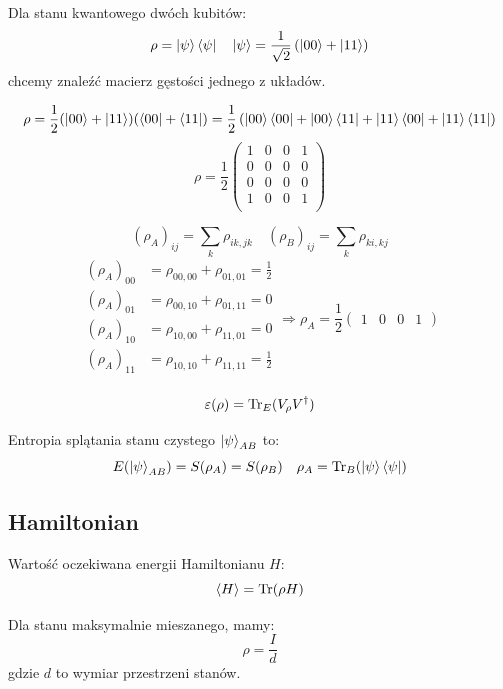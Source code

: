\documentclass{../notatki}
\begin{document}
\begin{examplebox}
  Dla stanu kwantowego dwóch kubitów:
  $$
  \rho = \ket{\psi} \bra{\psi} \quad \ket{\psi} = \frac{1}{\sqrt{2}}
  \left(\ket{00} + \ket{11}\right)
  $$
  chcemy znaleźć macierz gęstości jednego z układów.

  $$
  \rho = \frac{1}{2} (\ket{00} + \ket{11})(\bra{00} + \bra{11}) = \frac{1}{2}
  \left(\ket{00} \bra{00} + \ket{00} \bra{11} + \ket{11} \bra{00} +
  \ket{11} \bra{11}\right)
  $$
  $$
  \rho = \frac{1}{2}
  \begin{pmatrix}
    1 & 0 & 0 & 1 \\
    0 & 0 & 0 & 0 \\
    0 & 0 & 0 & 0 \\
    1 & 0 & 0 & 1 \\
  \end{pmatrix}
  $$

  $$
  (\rho_A)_{ij} = \sum_k \rho_{ik,jk} \quad (\rho_B)_{ij} = \sum_k \rho_{ki, kj}
  $$
  $$
  \begin{aligned}
    (\rho_A)_{00} &= \rho_{00, 00} + \rho_{01,01} = \frac{1}{2} \\
    (\rho_A)_{01} &= \rho_{00, 10} + \rho_{01,11} = 0 \\
    (\rho_A)_{10} &= \rho_{10, 00} + \rho_{11,01} = 0 \\
    (\rho_A)_{11} &= \rho_{10, 10} + \rho_{11,11} = \frac{1}{2} \\
  \end{aligned} \Rightarrow \rho_A = \frac{1}{2}
  \begin{pmatrix}
    1 & 0 & 0 & 1
  \end{pmatrix}
  $$

\end{examplebox}

$$
\varepsilon (\rho) = \Tr_E(V_\rho V^\dag)
$$

Entropia splątania stanu czystego $\ket{\psi}_{AB}$ to:
$$
E(\ket{\psi}_{AB}) = S(\rho_A) = S(\rho_B) \quad \rho_A =
\Tr_B(\ket{\psi} \bra{\psi})
$$

\subsection{Hamiltonian}

Wartość oczekiwana energii Hamiltonianu $H$:
$$
\langle H \rangle = \Tr(\rho H)
$$

Dla stanu maksymalnie mieszanego, mamy:
$$
\rho = \frac{I}{d}
$$
gdzie $d$ to wymiar przestrzeni stanów.
\end{document}
